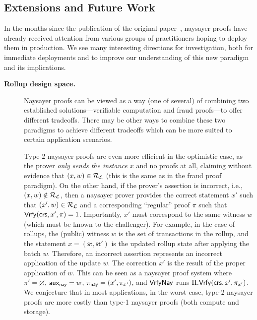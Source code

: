 \subsection{Extensions and Future Work}\label{sec:naysayer_extensions}

In the months since the publication of the original paper~\cite{FC:SerGlaBon24}, naysayer proofs have already received attention from various groups of practitioners hoping to deploy them in production. We see many interesting directions for investigation, both for immediate deployments and to improve our understanding of this new paradigm and its implications.

\begin{description}
    \item[\textbf{Rollup design space.}] Naysayer proofs can be viewed as a way (one of several) of combining two established solutions---verifiable computation and fraud proofs---to offer different tradeoffs. There may be other ways to combine these two paradigms to achieve different tradeoffs which can be more suited to certain application scenarios.
    
     Type-2 naysayer proofs are even more efficient in the optimistic case, as the prover \emph{only sends the instance $x$} and no proofs at all, claiming without evidence that $(x,w) \in \mathcal{R}_{\mathcal{L}}$ (this is the same as in the fraud proof paradigm). On the other hand, if the prover's assertion is incorrect, i.e., $(x,w) \notin \mathcal{R}_{\mathcal{L}}$, then a naysayer prover provides the correct statement $x'$ such that $(x',w) \in \mathcal{R}_{\mathcal{L}}$ 
    and a corresponding ``regular'' proof $\pi$ such that $\mathsf{Vrfy}(\mathsf{crs}, x', \pi) = 1$. Importantly, $x'$ must correspond to the same witness $w$ (which must be known to the challenger). For example, in the case of rollups, the (public) witness $w$ is the set of transactions in the rollup, and the statement $x = (\mathsf{st}, \mathsf{st}')$ is the updated rollup state after applying the batch $w$. Therefore, an incorrect assertion represents an incorrect application of the update $w$. The correction $x'$ is the result of the proper application of $w$.
    This can be seen as a naysayer proof system where $\pi' = \varnothing$, $\mathsf{aux}_{\mathsf{nay}} = w$, $\pi_{\mathsf{nay}} = (x', \pi_{x'})$, and ${\mathsf{Vrfy}}\mathsf{Nay}$ runs $\Pi.\mathsf{Vrfy}(\mathsf{crs}, x', \pi_{x'})$.
    We conjecture that in most applications, in the worst case, type-2 naysayer proofs are more costly than type-1 naysayer proofs (both compute and storage).



\end{description}
